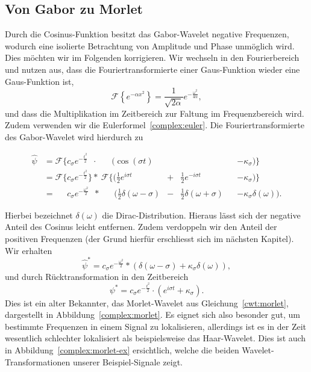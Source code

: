 \subsection{Von Gabor zu Morlet}
\label{complex:gabor-to-morlet}
Durch die Cosinus-Funktion besitzt das Gabor-Wavelet negative Frequenzen, wodurch eine isolierte Betrachtung von Amplitude und Phase unmöglich wird.
Dies möchten wir im Folgenden korrigieren.
Wir wechseln in den Fourierbereich und nutzen aus, dass die Fouriertransformierte einer Gaus-Funktion wieder eine Gaus-Funktion ist,
\[
	\mathcal{F}\left\lbrace e^{-\alpha x^2} \right\rbrace 
	= \frac{1}{\sqrt{2\alpha}}e^{- \frac{\omega^2}{4\alpha}},
\]
und dass die Multiplikation im Zeitbereich zur Faltung im Frequenzbereich wird.
Zudem verwenden wir die Eulerformel~\eqref{complex:euler}.
Die Fouriertransformierte des Gabor-Wavelet wird hierdurch zu

\begin{equation*}
\begin{aligned}
 \hat{\psi}
 & = \mathcal{F}\Bigg\lbrace c_\sigma e^{-\frac{t^2}{2}}\phantom{\Bigg\rbrace}
 \cdot\; \phantom{\mathcal{F}\Bigg\lbrace}
 \Bigg(\cos\left(\sigma t\right) &&
 &&- \kappa_\sigma\Bigg) \Bigg\rbrace \\
 & = \mathcal{F}\Bigg\lbrace c_\sigma e^{-\frac{t^2}{2}} \Bigg\rbrace 
 *\: \mathcal{F}\Bigg\lbrace\Bigg( \frac12 e^{i\sigma t} &+& \frac12 e^{-i\sigma t}
 &&- \kappa_\sigma \Bigg)\Bigg\rbrace\\
 & = \phantom{\mathcal{F}\Bigg\lbrace} c_\sigma e^{- \frac{\omega^2}{2}} \phantom{\Big\rbrace}
 *\:\phantom{\mathcal{F}\Bigg\lbrace} \Bigg(
  \frac{1}{2}\delta(\omega - \sigma) &-&
  \frac{1}{2}\delta(\omega + \sigma) 
 && - \kappa_\sigma\delta(\omega)
  \Bigg).
\end{aligned}
\end{equation*}

Hierbei bezeichnet $\delta(\omega)$ die Dirac-Distribution.
Hieraus lässt sich der negative Anteil des Cosinus leicht entfernen.
Zudem verdoppeln wir den Anteil der positiven Frequenzen (der Grund hierfür erschliesst sich im nächsten Kapitel).
Wir erhalten
\[
	\hat{\psi}^\ast = 
	c_\sigma e^{- \frac{\omega^2}{2}} * \left(
	\delta(\omega - \sigma) +
	\kappa_\sigma\delta(\omega)
	\right),
\]
und durch Rücktransformation in den Zeitbereich
\[
	\psi^\ast = 
	c_\sigma e^{- \frac{t^2}{2}} \cdot \left(
	e^{i\sigma t} +
	\kappa_\sigma
	\right).
\]
Dies ist ein alter Bekannter, das Morlet-Wavelet aus Gleichung~\eqref{cwt:morlet}, dargestellt in Abbildung~\ref{complex:morlet}.
Es eignet sich also besonder gut, um bestimmte Frequenzen in einem Signal zu lokalisieren, allerdings ist es in der Zeit wesentlich schlechter lokalisiert als beispielsweise das Haar-Wavelet.
Dies ist auch in Abbildung~\ref{complex:morlet-ex} ersichtlich, welche die beiden Wavelet-Transformationen unserer Beispiel-Signale zeigt.

